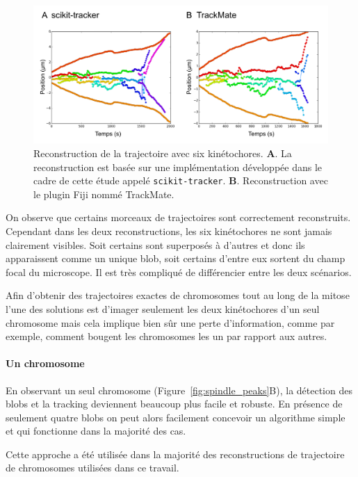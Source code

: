 \documentclass[12pt,a4paper,twoside,openright]{book}
\let\oldparagraph\paragraph
\renewcommand{\paragraph}[1]{\oldparagraph{#1}\mbox{}}
\begin{document}
\begin{figure}[htbp]
\centering
\includegraphics{figures/results/imaging/ndc80.png}
\caption[Reconstruction de la trajectoire avec six kinétochores]{\label{fig:ndc80}Reconstruction
de la trajectoire avec six kinétochores. \textbf{A}. La reconstruction
est basée sur une implémentation développée dans le cadre de cette étude
appelé \texttt{scikit-tracker}. \textbf{B}. Reconstruction avec le
plugin Fiji nommé TrackMate.}
\end{figure}

On observe que certains morceaux de trajectoires sont correctement
reconstruits. Cependant dans les deux reconstructions, les six
kinétochores ne sont jamais clairement visibles. Soit certains sont
superposés à d'autres et donc ils apparaissent comme un unique blob,
soit certains d'entre eux sortent du champ focal du microscope. Il est
très compliqué de différencier entre les deux scénarios.

Afin d'obtenir des trajectoires exactes de chromosomes tout au long de
la mitose l'une des solutions est d'imager seulement les deux
kinétochores d'un seul chromosome mais cela implique bien sûr une perte
d'information, comme par exemple, comment bougent les chromosomes les un
par rapport aux autres.

\paragraph{Un chromosome}\label{un-chromosome}

En observant un seul chromosome (Figure~\ref{fig:spindle_peaks}B), la
détection des blobs et la tracking deviennent beaucoup plus facile et
robuste. En présence de seulement quatre blobs on peut alors facilement
concevoir un algorithme simple et qui fonctionne dans la majorité des
cas.

Cette approche a été utilisée dans la majorité des reconstructions de
trajectoire de chromosomes utilisées dans ce travail.
\end{document}

